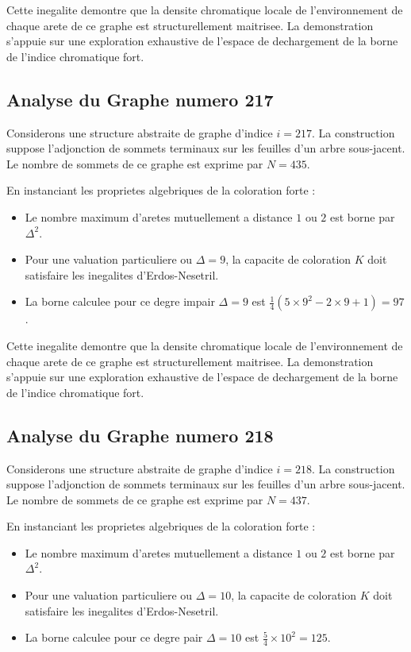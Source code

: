 \documentclass[11pt,a4paper]{article}
\begin{document}
Cette inegalite demontre que la densite chromatique locale de l'environnement de chaque arete de ce graphe est structurellement maitrisee. La demonstration s'appuie sur une exploration exhaustive de l'espace de dechargement de la borne de l'indice chromatique fort.

\subsection{Analyse du Graphe numero 217}
Considerons une structure abstraite de graphe d'indice $i = 217$. La construction suppose l'adjonction de sommets terminaux sur les feuilles d'un arbre sous-jacent. Le nombre de sommets de ce graphe est exprime par $N = 435$.

En instanciant les proprietes algebriques de la coloration forte :
\begin{itemize}
\item Le nombre maximum d'aretes mutuellement a distance $1$ ou $2$ est borne par $\Delta^2$.
\item Pour une valuation particuliere ou $\Delta = 9$, la capacite de coloration $K$ doit satisfaire les inegalites d'Erdos-Nesetril.
\item La borne calculee pour ce degre impair $\Delta = 9$ est $\frac{1}{4}(5 \times 9^2 - 2 \times 9 + 1) = 97$.
\end{itemize}

Cette inegalite demontre que la densite chromatique locale de l'environnement de chaque arete de ce graphe est structurellement maitrisee. La demonstration s'appuie sur une exploration exhaustive de l'espace de dechargement de la borne de l'indice chromatique fort.

\subsection{Analyse du Graphe numero 218}
Considerons une structure abstraite de graphe d'indice $i = 218$. La construction suppose l'adjonction de sommets terminaux sur les feuilles d'un arbre sous-jacent. Le nombre de sommets de ce graphe est exprime par $N = 437$.

En instanciant les proprietes algebriques de la coloration forte :
\begin{itemize}
\item Le nombre maximum d'aretes mutuellement a distance $1$ ou $2$ est borne par $\Delta^2$.
\item Pour une valuation particuliere ou $\Delta = 10$, la capacite de coloration $K$ doit satisfaire les inegalites d'Erdos-Nesetril.
\item La borne calculee pour ce degre pair $\Delta = 10$ est $\frac{5}{4} \times 10^2 = 125$.
\end{itemize}
\end{document}
